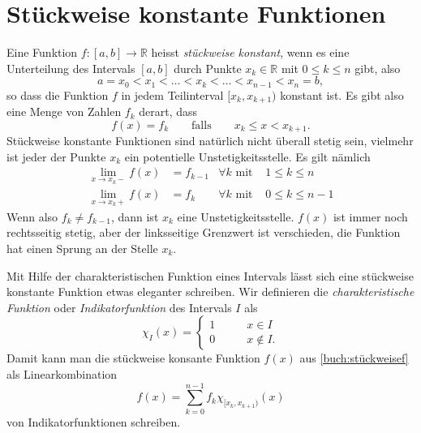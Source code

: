 %
%
%
\section{Stückweise konstante Funktionen%
\label{section:stueckweise}}
Eine Funktion $f\colon[a,b]\to\mathbb R$ heisst {\em stückweise konstant},
wenn es eine Unterteilung des Intervals $[a,b]$ durch Punkte
$x_k\in\mathbb R$ mit $0\le k\le n$ gibt, also
\[
a=x_0 < x_1 < \dots < x_k < \dots < x_{n-1} < x_n = b,
\]
so dass die Funktion $f$ in jedem Teilinterval $[x_k,x_{k+1})$
konstant ist.
Es gibt also eine Menge von Zahlen $f_k$ derart, dass
\begin{equation}
f(x)
=
f_k
\qquad\text{falls}\qquad
x_k \le x < x_{k+1}.
\label{buch:stückweisef}
\end{equation}
Stückweise konstante Funktionen sind natürlich nicht überall stetig sein,
vielmehr ist jeder der Punkte $x_k$ ein potentielle Unstetigkeitsstelle.
Es gilt nämlich
\begin{align*}
\lim_{x\to x_k-} f(x)
&=
f_{k-1}&\forall k\text{ mit }&1\le k \le n
\\
\lim_{x\to x_k+} f(x)
&=
f_k&\forall k\text{ mit }&0\le k \le n-1
\end{align*}
Wenn also $f_k\ne f_{k-1}$, dann ist $x_k$ eine Unstetigkeitsstelle.
$f(x)$ ist immer noch rechtsseitig stetig, aber der linksseitige
Grenzwert ist verschieden, die Funktion hat einen Sprung an der
Stelle $x_k$.

Mit Hilfe der charakteristischen Funktion eines Intervals lässt sich
eine stückweise konstante Funktion etwas eleganter schreiben.
Wir definieren  die {\em charakteristische Funktion} oder
{\em Indikatorfunktion} des Intervals $I$ als
\[
\chi_{I}(x) = \begin{cases}
1&\qquad x\in I\\
0&\qquad x\not\in I.
\end{cases}
\]
Damit kann man die stückweise konsante Funktion $f(x)$ aus
\eqref{buch:stückweisef}
als Linearkombination
\[
f(x)
=
\sum_{k=0}^{n-1} f_k\chi_{[x_k,x_{k+1})}(x)
\]
von Indikatorfunktionen schreiben.

